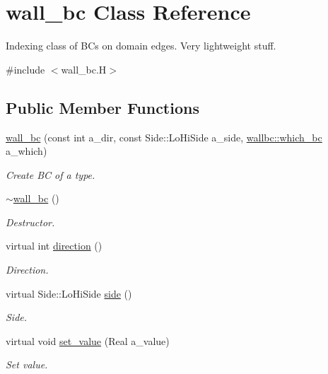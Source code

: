 \hypertarget{classwall__bc}{}\section{wall\+\_\+bc Class Reference}
\label{classwall__bc}


Indexing class of B\+Cs on domain edges. Very lightweight stuff.  




{\ttfamily \#include $<$wall\+\_\+bc.\+H$>$}

\subsection*{Public Member Functions}
\begin{DoxyCompactItemize}
\item 
\hyperlink{classwall__bc_af46f1060c8dbe2f4fbd36dc3d6ec86ca}{wall\+\_\+bc} (const int a\+\_\+dir, const Side\+::\+Lo\+Hi\+Side a\+\_\+side, \hyperlink{namespacewallbc_ac79598e478fbcdc07082173cc75d4d99}{wallbc\+::which\+\_\+bc} a\+\_\+which)
\begin{DoxyCompactList}\small\item\em Create BC of a type. \end{DoxyCompactList}\item 
\hyperlink{classwall__bc_a210db24b83dd17823058fd9534357c18}{$\sim$wall\+\_\+bc} ()
\begin{DoxyCompactList}\small\item\em Destructor. \end{DoxyCompactList}\item 
virtual int \hyperlink{classwall__bc_ad75f4762efdc071133dc2cd9d6f0ce44}{direction} ()
\begin{DoxyCompactList}\small\item\em Direction. \end{DoxyCompactList}\item 
virtual Side\+::\+Lo\+Hi\+Side \hyperlink{classwall__bc_aa1f4913516a022abded3f5c67cdbc4f8}{side} ()
\begin{DoxyCompactList}\small\item\em Side. \end{DoxyCompactList}\item 
virtual void \hyperlink{classwall__bc_a66fd9148238e40afad73d7c6cb4ee9b2}{set\+\_\+value} (Real a\+\_\+value)
\begin{DoxyCompactList}\small\item\em Set value. \end{DoxyCompactList}\item 

\end{DoxyCompactItemize}
